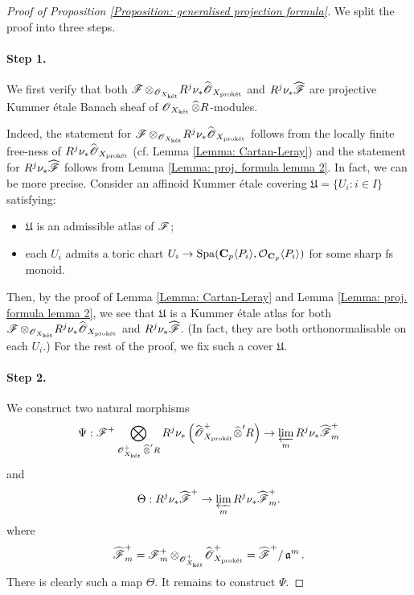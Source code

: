 \begin{proof}[Proof of Proposition \ref{Proposition: generalised projection formula}]
We split the proof into three steps.

\paragraph{Step 1.} We first verify that both $\operatorname{\mathscr{F}}\otimes_{\operatorname{\mathscr{O}}_{X_{\operatorname{\textrm{k\'{e}t}}}}} R^j\nu_*\widehat{\operatorname{\mathscr{O}}}_{X_{\operatorname{\textrm{prok\'{e}t}}}}$ and $R^j\nu_* \widehat{\operatorname{\mathscr{F}}}$ are projective Kummer \'etale Banach sheaf of $\operatorname{\mathscr{O}}_{X_{\operatorname{\textrm{k\'{e}t}}}}\widehat{\otimes} R$-modules.

Indeed, the statement for $\operatorname{\mathscr{F}}\otimes_{\operatorname{\mathscr{O}}_{X_{\operatorname{\textrm{k\'{e}t}}}}} R^j\nu_*\widehat{\operatorname{\mathscr{O}}}_{X_{\operatorname{\textrm{prok\'{e}t}}}}$ follows from the locally finite free-ness of $R^j\nu_*\widehat{\operatorname{\mathscr{O}}}_{X_{\operatorname{\textrm{prok\'{e}t}}}}$ (cf. Lemma \ref{Lemma: Cartan-Leray}) and the statement for $R^j\nu_* \widehat{\operatorname{\mathscr{F}}}$ follows from Lemma \ref{Lemma: proj. formula lemma 2}. In fact, we can be more precise. Consider an affinoid Kummer \'etale covering $\mathfrak{U}=\{U_i: i\in I\}$ satisfying:
\begin{itemize}
\item $\mathfrak{U}$ is an admissible atlas of $\operatorname{\mathscr{F}}$;
\item each $U_i$ admits a toric chart $U_i\rightarrow \operatorname{Spa}(\operatorname{\mathbf{C}}_p\langle P_i\rangle, \operatorname{\mathcal{O}}_{\operatorname{\mathbf{C}}_p}\langle P_i\rangle)$ for some sharp fs monoid.
\end{itemize}
Then, by the proof of Lemma \ref{Lemma: Cartan-Leray} and Lemma \ref{Lemma: proj. formula lemma 2}, we see that $\mathfrak{U}$ is a Kummer \'etale atlas for both $\operatorname{\mathscr{F}}\otimes_{\operatorname{\mathscr{O}}_{X_{\operatorname{\textrm{k\'{e}t}}}}} R^j\nu_*\widehat{\operatorname{\mathscr{O}}}_{X_{\operatorname{\textrm{prok\'{e}t}}}}$ and $R^j\nu_* \widehat{\operatorname{\mathscr{F}}}$. (In fact, they are both orthonormalisable on each $U_i$.) For the rest of the proof, we fix such a cover $\mathfrak{U}$.

\paragraph{Step 2.} We construct two natural morphisms
$$
\Psi: \operatorname{\mathscr{F}}^+\bigotimes_{\operatorname{\mathscr{O}}^+_{X_{\operatorname{\textrm{k\'{e}t}}}}\widehat{\otimes}'R} R^j\nu_*\left(\widehat{\operatorname{\mathscr{O}}}^+_{X_{\operatorname{\textrm{prok\'{e}t}}}}\widehat{\otimes}'R\right)\rightarrow \varprojlim_{m}R^j\nu_{*}\widehat{\operatorname{\mathscr{F}}}_m^+
$$
and
$$
 \Theta: R^j\nu_*\widehat{\operatorname{\mathscr{F}}}^+ \rightarrow \varprojlim_{m}R^j\nu_{*}\widehat{\operatorname{\mathscr{F}}}_m^+.
$$
where $$\widehat{\operatorname{\mathscr{F}}}^+_m=\operatorname{\mathscr{F}}^+_m\otimes_{\operatorname{\mathscr{O}}^+_{X_{\operatorname{\textrm{k\'{e}t}}}}}\widehat{\operatorname{\mathscr{O}}}^+_{X_{\operatorname{\textrm{prok\'{e}t}}}}=\widehat{\operatorname{\mathscr{F}}}^+/\operatorname{\mathfrak{a}}^m.$$
There is clearly such a map $\Theta$. It remains to construct $\Psi$.


\end{proof}
